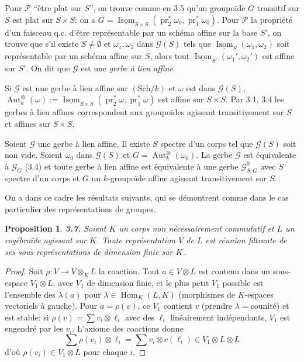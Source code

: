 \documentclass[12pt,a4paper]{article}
\theoremstyle{plain}
\newtheorem{proposition}[theorem]{Proposition}
\theoremstyle{definition}
\theoremstyle{remark}
\DeclareMathOperator{\Hom}{Hom}
\DeclareMathOperator{\Aut}{Aut}
\DeclareMathOperator{\Isom}{Isom}
\DeclareMathOperator{\pr}{pr}
\begin{document}
Pour $\mathcal{P}$ ``être plat sur $S$'', on trouve comme en 3.5 qu'un groupoïde $G$ transitif sur $S$ est plat sur $S \times S$: on a $G = \underline{\Isom}_{S \times S}(\pr_2^*\omega_0, \pr_1^*\omega_0)$. Pour $\mathcal{P}$ la propriété d'un faisceau q.c. d'être représentable par un schéma affine sur la base $S'$, on trouve que s'il existe $S \neq \emptyset$ et $\omega_1, \omega_2$ dans $\mathcal{G}(S)$ tels que $\underline{\Isom}_S(\omega_1,\omega_2)$ soit représentable par un schéma affine sur $S$, alors tout $\underline{\Isom}_{S'}(\omega_1',\omega_2')$ est affine sur $S'$. On dit que $\mathcal{G}$ est une \emph{gerbe à lien affine}.

Si $\mathcal{G}$ est une gerbe à lien affine sur $(\mathrm{Sch}/k)$ et $\omega$ est dans $\mathcal{G}(S)$, $\Aut^\otimes_k(\omega) := \underline{\Isom}_{S \times S}(\pr_2^*\omega, \pr_1^*\omega)$ est affine sur $S \times S$. Par 3.1, 3.4 les gerbes à lien affines correspondent aux groupoïdes agissant transitivement sur $S$ et affines sur $S \times S$.

Soient $\mathcal{G}$ une gerbe à lien affine. Il existe $S$ spectre d'un corps tel que $\mathcal{G}(S)$ soit non vide. Soient $\omega_0$ dans $\mathcal{G}(S)$ et $G = \Aut^\otimes_k(\omega_0)$. La gerbe $\mathcal{G}$ est équivalente à $\mathcal{G}_G$ (3.4) et toute gerbe à lien affine est équivalente à une gerbe $\mathcal{G}^0_{S:G}$ avec $S$ spectre d'un corps et $G$ un $k$-groupoïde affine agissant transitivement sur $S$.

On a dans ce cadre les résultats suivants, qui se démontrent comme dans le cas particulier des représentations de groupes.

\begin{proposition}\label{prop:3.7}
\textbf{3.7.} Soient $K$ un corps non nécessairement commutatif et $L$ un cogébroïde agissant sur $K$. Toute représentation $V$ de $L$ est réunion filtrante de ses sous-représentations de dimension finie sur $K$.
\end{proposition}

\begin{proof}
Soit $\rho : V \to V \otimes_K L$ la coaction. Tout $a \in V \otimes L$ est contenu dans un sous-espace $V_1 \otimes L$, avec $V_1$ de dimension finie, et le plus petit $V_1$ possible est l'ensemble des $\lambda(a)$ pour $\lambda \in \Hom_K(L,K)$ (morphismes de $K$-espaces vectoriels à gauche). Pour $a = \rho(v)$, ce $V_1$ contient $v$ (prendre $\lambda = \text{counité}$) et est stable: si $\rho(v) = \sum v_i \otimes \ell_i$ avec des $\ell_i$ linéairement indépendants, $V_1$ est engendré par les $v_i$. L'axiome des coactions donne
\[
\sum \rho(v_i) \otimes \ell_i = \sum v_i \otimes c(\ell_i) \in V_1 \otimes L \otimes L
\]
d'où $\rho(v_i) \in V_1 \otimes L$ pour chaque $i$.
\end{proof}
\end{document}
